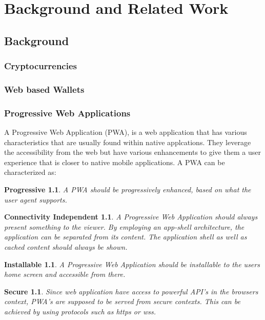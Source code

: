 \chapter{Background and Related Work}
\section{Background}
\subsection{Cryptocurrencies}
\subsection{Web based Wallets}
\subsection{Progressive Web Applications}
A Progressive Web Application (PWA), is a web application that has various characteristics that are usually found within native applcations.
They leverage the accessibility from the web but have various enhancements to give them a user experience that is closer to native mobile applications.
A PWA can be characterized as:
\newtheorem{theorem-progressive}{Progressive}
\newtheorem{theorem}{Connectivity Independent}
\newtheorem{theorem-install}{Installable}
\newtheorem{theorem-secure}{Secure}

\begin{theorem-progressive}
A PWA should be progressively enhanced, based on what the user agent supports.
\end{theorem-progressive}

\begin{theorem}
A Progressive Web Application should always present something to the viewer. By employing an app-shell architecture, the application can be separated from its content. The application shell as well as cached content should always be shown.
\end{theorem}
\begin{theorem-install}
A Progressive Web Application should be installable to the users home screen and accessible from there.

\end{theorem-install}
\begin{theorem-secure}
Since web application have access to powerful API's in the browsers context, PWA's are supposed to be served from secure contexts. This can be achieved by using protocols such as https or wss.

\end{theorem-secure}
